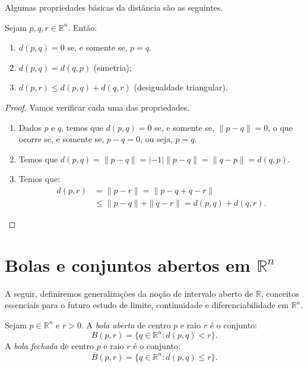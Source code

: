 Algumas propriedades básicas da distância são as seguintes.
\begin{proposition}
    Sejam $p, q, r \in \mathbb R^n$. Então:
    \begin{enumerate}
        \item $d(p, q) = 0$ se, e somente se, $p=q$.
        \item $d(p, q) = d(q, p)$ (simetria);
        \item $d(p, r) \leq d(p, q) + d(q, r)$ (desigualdade triangular).
    \end{enumerate}
\end{proposition}
\begin{proof}
    Vamos verificar cada uma das propriedades.
    \begin{enumerate}
        \item Dados $p$ e $q$, temos que $d(p, q) = 0$ se, e somente se, $\|p-q\|=0$, o que ocorre se, e somente se, $p-q=0$, ou seja, $p=q$.
        \item Temos que $d(p, q) = \|p-q\| = |-1|\|p-q\| = \|q-p\| = d(q, p)$.
        \item Temos que:
        \begin{align*}
            d(p, r) &= \|p-r\| = \|p-q+q-r\| \\
            &\leq \|p-q\| + \|q-r\| = d(p, q) + d(q, r).
        \end{align*}
    \end{enumerate}
\end{proof}

\section{Bolas e conjuntos abertos em $\mathbb R^n$}
A seguir, definiremos generalizações da noção de intervalo aberto de $\mathbb R$, conceitos essenciais para o futuro estudo de limite, continuidade e diferenciabilidade em $\mathbb R^n$.

\begin{definition}
    Sejam $p \in \mathbb R^n$ e $r>0$. A \emph{bola aberta} de centro $p$ e raio $r$ é o conjunto:
    \begin{equation*}
        B(p, r) = \{q \in \mathbb R^n : d(p, q) < r\}.
    \end{equation*}
    A \emph{bola fechada} de centro $p$ e raio $r$ é o conjunto:
    \begin{equation*}
        \overline B(p, r) = \{q \in \mathbb R^n : d(p, q) \leq r\}.
    \end{equation*}
\end{definition}


